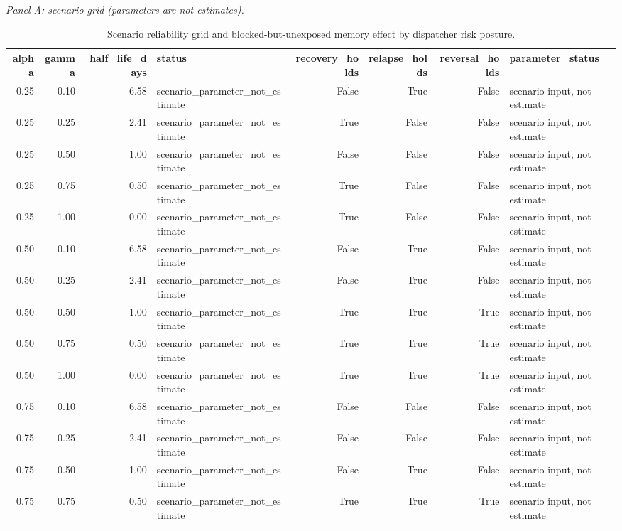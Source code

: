 \begin{table}
\centering
\caption{Scenario reliability grid and blocked-but-unexposed memory effect by dispatcher risk posture.}
\label{tab:reliability-region}
\textit{Panel A: scenario grid (parameters are not estimates).}\par
\begin{tabular}{rrrlrrrl}
\toprule
alpha & gamma & half\_life\_days & status & recovery\_holds & relapse\_holds & reversal\_holds & parameter\_status \\
\midrule
0.25 & 0.10 & 6.58 & scenario\_parameter\_not\_estimate & False & True & False & scenario input, not estimate \\
0.25 & 0.25 & 2.41 & scenario\_parameter\_not\_estimate & True & False & False & scenario input, not estimate \\
0.25 & 0.50 & 1.00 & scenario\_parameter\_not\_estimate & False & False & False & scenario input, not estimate \\
0.25 & 0.75 & 0.50 & scenario\_parameter\_not\_estimate & True & False & False & scenario input, not estimate \\
0.25 & 1.00 & 0.00 & scenario\_parameter\_not\_estimate & True & False & False & scenario input, not estimate \\
0.50 & 0.10 & 6.58 & scenario\_parameter\_not\_estimate & False & True & False & scenario input, not estimate \\
0.50 & 0.25 & 2.41 & scenario\_parameter\_not\_estimate & False & True & False & scenario input, not estimate \\
0.50 & 0.50 & 1.00 & scenario\_parameter\_not\_estimate & True & True & True & scenario input, not estimate \\
0.50 & 0.75 & 0.50 & scenario\_parameter\_not\_estimate & True & True & True & scenario input, not estimate \\
0.50 & 1.00 & 0.00 & scenario\_parameter\_not\_estimate & True & True & True & scenario input, not estimate \\
0.75 & 0.10 & 6.58 & scenario\_parameter\_not\_estimate & False & False & False & scenario input, not estimate \\
0.75 & 0.25 & 2.41 & scenario\_parameter\_not\_estimate & False & False & False & scenario input, not estimate \\
0.75 & 0.50 & 1.00 & scenario\_parameter\_not\_estimate & False & True & False & scenario input, not estimate \\
0.75 & 0.75 & 0.50 & scenario\_parameter\_not\_estimate & True & True & True & scenario input, not estimate \\

\end{tabular}
\end{table}
